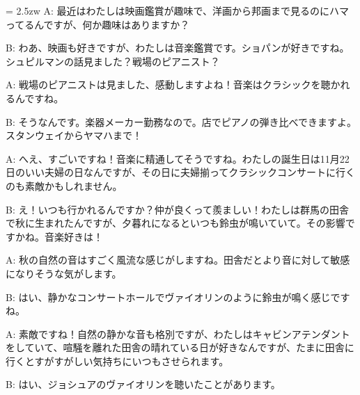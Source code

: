 \documentclass[11pt]{amsart}
\title{}
\author{}
\newenvironment{hangall}[1]{\hangindent = 2.5zw\everypar{\hangindent = 2.5zw}}{}
\begin{document}
\maketitle
\begin{hangall}{}%
A: 最近はわたしは映画鑑賞が趣味で、洋画から邦画まで見るのにハマってるんですが、何か趣味はありますか？



B: わあ、映画も好きですが、わたしは音楽鑑賞です。ショパンが好きですね。シュピルマンの話見ました？戦場のピアニスト？



A: 戦場のピアニストは見ました、感動しますよね！音楽はクラシックを聴かれるんですね。



B: そうなんです。楽器メーカー勤務なので。店でピアノの弾き比べできますよ。スタンウェイからヤマハまで！



A: へえ、すごいですね！音楽に精通してそうですね。わたしの誕生日は11月22日のいい夫婦の日なんですが、その日に夫婦揃ってクラシックコンサートに行くのも素敵かもしれません。



B: え！いつも行かれるんですか？仲が良くって羨ましい！わたしは群馬の田舎で秋に生まれたんですが、夕暮れになるといつも鈴虫が鳴いていて。その影響ですかね。音楽好きは！



A: 秋の自然の音はすごく風流な感じがしますね。田舎だとより音に対して敏感になりそうな気がします。



B: はい、静かなコンサートホールでヴァイオリンのように鈴虫が鳴く感じですね。



A: 素敵ですね！自然の静かな音も格別ですが、わたしはキャビンアテンダントをしていて、喧騒を離れた田舎の晴れている日が好きなんですが、たまに田舎に行くとすがすがしい気持ちにいつもさせられます。



B: はい、ジョシュアのヴァイオリンを聴いたことがあります。\end{hangall}
\end{document}
